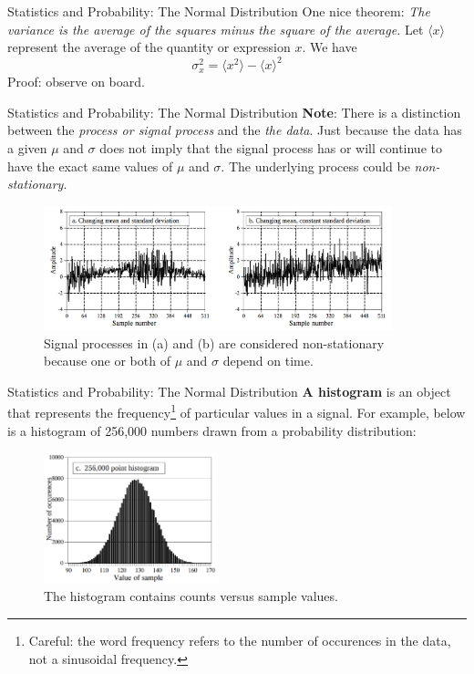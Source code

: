\documentclass{beamer}
\begin{document}
\begin{frame}[fragile]{Statistics and Probability: The Normal Distribution}
One nice theorem: \textit{The variance is the average of the squares minus the square of the average.}  Let $\langle x \rangle$ represent the average of the quantity or expression $x$.  We have
\begin{equation}
\sigma_x^2 = \langle x^2 \rangle - \langle x \rangle^2
\end{equation}
Proof: observe on board.
\end{frame}

\begin{frame}[fragile]{Statistics and Probability: The Normal Distribution}
\small
\textbf{Note}: There is a distinction between the \textit{process or signal process} and the \textit{the data}.  Just because the data has a given $\mu$ and $\sigma$ does not imply that the signal process has or will continue to have the exact same values of $\mu$ and $\sigma$.  The underlying process could be \textit{non-stationary}.
\begin{figure}
\centering
\includegraphics[width=0.9\textwidth]{figures/non_stationary.png}
\caption{\label{fig:non_stationary} Signal processes in (a) and (b) are considered \alert{non-stationary} because one or both of $\mu$ and $\sigma$ depend on time.}
\end{figure}
\end{frame}

\begin{frame}[fragile]{Statistics and Probability: The Normal Distribution}
\small
\textbf{A histogram} is an object that represents the frequency\footnote{Careful: the word frequency refers to the number of occurences in the data, not a sinusoidal frequency.} of particular values in a signal.  For example, below is a histogram of 256,000 numbers drawn from a probability distribution:
\begin{figure}
\centering
\includegraphics[width=0.45\textwidth]{figures/hist.png}
\caption{\label{fig:hist} The histogram contains counts versus sample values.}
\end{figure}
\end{frame}
\end{document}
